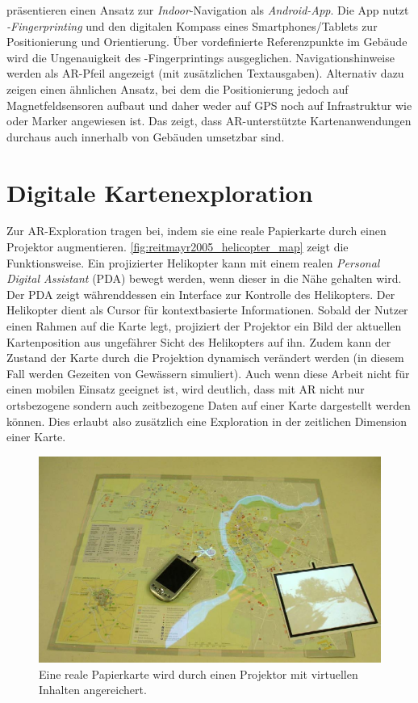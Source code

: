 \textcite{Alnabhan2014} präsentieren einen Ansatz zur \emph{Indoor}-Navigation als \emph{Android-App}.
Die App nutzt \emph{\wifi-Fingerprinting} und den digitalen Kompass eines Smartphones/Tablets zur Positionierung und Orientierung.
Über vordefinierte Referenzpunkte im Gebäude wird die Ungenauigkeit des \wifi-Fingerprintings ausgeglichen.
Navigationshinweise werden als AR-Pfeil angezeigt (mit zusätzlichen Textausgaben).
Alternativ dazu zeigen \textcite{Liu2016} einen ähnlichen Ansatz, bei dem die Positionierung jedoch auf Magnetfeldsensoren aufbaut und daher weder auf GPS noch auf Infrastruktur wie \wifi oder Marker angewiesen ist.
Das zeigt, dass AR-unterstützte Kartenanwendungen durchaus auch innerhalb von Gebäuden umsetzbar sind.

\section{Digitale Kartenexploration}
Zur AR-Exploration tragen \textcite{Reitmayr2005} bei, indem sie eine reale Papierkarte durch einen Projektor augmentieren.
\autoref{fig:reitmayr2005_helicopter_map} zeigt die Funktionsweise.
Ein projizierter Helikopter kann mit einem realen \emph{Personal Digital Assistant} (PDA) bewegt werden, wenn dieser in die Nähe gehalten wird.
Der PDA zeigt währenddessen ein Interface zur Kontrolle des Helikopters.
Der Helikopter dient als Cursor für kontextbasierte Informationen.
Sobald der Nutzer einen Rahmen auf die Karte legt, projiziert der Projektor ein Bild der aktuellen Kartenposition aus ungefährer Sicht des Helikopters auf ihn.
Zudem kann der Zustand der Karte durch die Projektion dynamisch verändert werden (in diesem Fall werden Gezeiten von Gewässern simuliert).
Auch wenn diese Arbeit nicht für einen mobilen Einsatz geeignet ist, wird deutlich, dass mit AR nicht nur ortsbezogene sondern auch zeitbezogene Daten auf einer Karte dargestellt werden können.
Dies erlaubt also zusätzlich eine Exploration in der zeitlichen Dimension einer Karte.

\begin{figure}[t]
	\includegraphics[width=\textwidth]{figures/reitmayr2005_helicopter_map.png}
	\caption{Eine reale Papierkarte wird durch einen Projektor mit virtuellen Inhalten angereichert.}
	\label{fig:reitmayr2005_helicopter_map}
\end{figure}

